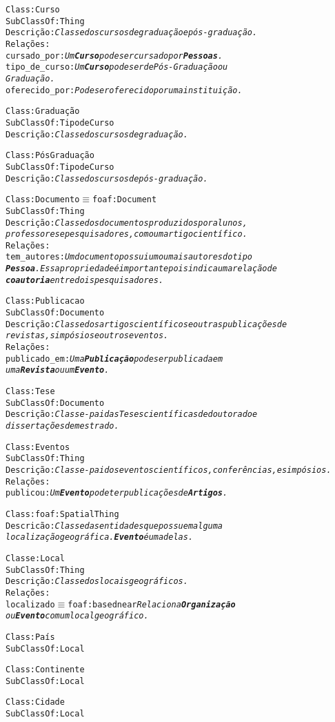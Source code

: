 \begin{alltt}
Class: Curso
SubClassOf: Thing
Descrição: \emph{Classe dos cursos de graduação e pós-graduação.}
Relações:
  cursado_por: \emph{Um \textbf{Curso} pode ser cursado por \textbf{Pessoas}.}
  tipo_de_curso: \emph{Um \textbf{Curso} pode ser de Pós-Graduação ou
  Graduação.}
  oferecido_por: \emph{Pode ser oferecido por uma instituição.}

Class: Graduação
SubClassOf: Tipo de Curso
Descrição: \emph{Classe dos cursos de graduação.}

Class: Pós Graduação
SubClassOf: Tipo de Curso
Descrição: \emph{Classe dos cursos de pós-graduação.}

Class: Documento \( \equiv \) foaf:Document
SubClassOf: Thing
Descrição: \emph{Classe dos documentos produzidos por alunos,
professores e pesquisadores, como um artigo científico.}
Relações:
  tem_autores: \emph{Um documento possui um ou mais autores do tipo
  \textbf{Pessoa}. Essa propriedade é importante pois indica uma relação de
  \textbf{coautoria} entre dois pesquisadores.}

Class: Publicacao
SubClassOf: Documento
Descrição: \emph{Classe dos artigos científicos e outras publicações de
revistas, simpósios e outros eventos.}
Relações:
  publicado_em: \emph{Uma \textbf{Publicação} pode ser publicada em
  uma \textbf{Revista} ou um \textbf{Evento}.}

Class: Tese
SubClassOf: Documento
Descrição: \emph{Classe-pai das Teses científicas de doutorado e
dissertações de mestrado.}

Class: Eventos
SubClassOf: Thing
Descrição: \emph{Classe-pai dos eventos científicos, conferências, e simpósios.}
Relações:
  publicou: \emph{Um \textbf{Evento} pode ter publicações de \textbf{Artigos}.}

Class: foaf:Spatial Thing
Descricão: \emph{Classe das entidades que possuem alguma
localização geográfica. \textbf{Evento} é uma delas.}

Classe: Local
SubClassOf: Thing
Descrição: \emph{Classe dos locais geográficos.}
Relações:
  localizado \( \equiv \) foaf:based near \emph{Relaciona \textbf{Organização}
  ou \textbf{Evento} com um local geográfico.}

Class: País
SubClassOf: Local

Class: Continente
SubClassOf: Local

Class: Cidade
SubClassOf: Local

\end{alltt}

